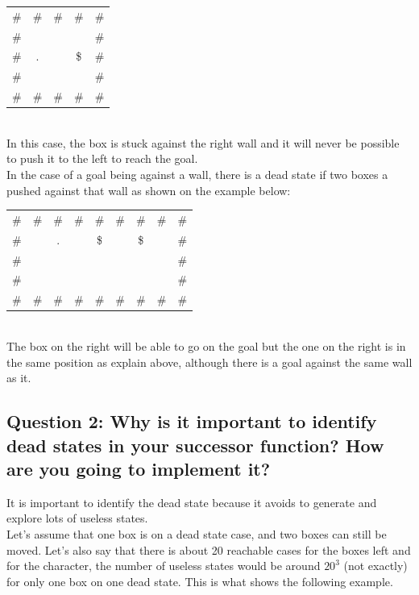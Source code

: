 \documentclass[a4paper,10pt]{article}
\begin{document}
	\begin{tabular}{ccccc}
		\# & \# & \# & \# & \# \\ 
		\# &    &    &    & \# \\ 
		\# & .  &    & \$ & \# \\ 
		\# &    &    &    & \# \\ 
		\# & \# & \# & \# & \# \\ 
	\end{tabular}\\
	
	In this case, the box is stuck against the right wall and it will never be possible to push it to the left to reach the goal.\\
	In the case of a goal being against a wall, there is a dead state if two boxes a pushed against that wall as shown on the example below: \\
	
	\begin{tabular}{ccccccccc}
		\# & \# & \# & \# & \# & \# & \# & \# & \# \\ 
		\# &    & .  &    & \$ &    & \$ &    & \# \\ 
		\# &    &    &    &    &    &    &    & \# \\ 
		\# &    &    &    &    &    &    &    & \# \\ 
		\# & \# & \# & \# & \# & \# & \# & \# & \# \\ 
	\end{tabular}\\
	
	The box on the right will be able to go on the goal but the one on the right is in the same position as explain above, although there is a goal against the same wall as it.
		
		\subsection{Question 2: Why is it important to identify dead states in your successor function? How are you going to implement it?}
			
			It is important to identify the dead state because it avoids to generate and explore lots of useless states.\\
			 Let's assume that one box is on a dead state case, and two boxes can still be moved. Let's also say that there is about 20 reachable cases for the boxes left and for the character, the number of useless states would be around $ 20^{3} $ (not exactly) for only one box on one dead state. This is what shows the following example.\\
			 
\end{document}
